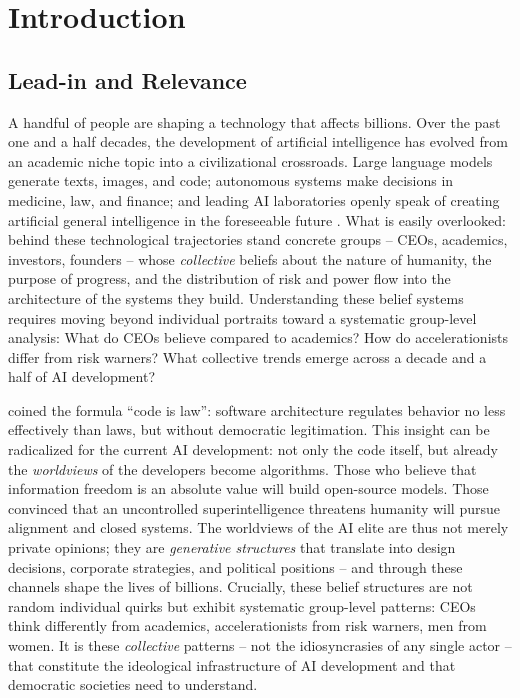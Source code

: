 \documentclass[12pt,a4paper]{article}
\begin{document}
\newpage
\setcounter{page}{1}

\section{Introduction}
\label{sec:einleitung}

\subsection{Lead-in and Relevance}
\label{sec:einleitung:relevanz}

A handful of people are shaping a technology that affects billions. Over the past one and a half decades, the development of artificial intelligence has evolved from an academic niche topic into a civilizational crossroads. Large language models generate texts, images, and code; autonomous systems make decisions in medicine, law, and finance; and leading AI laboratories openly speak of creating artificial general intelligence in the foreseeable future \citep{OpenAI2023Charter, AnthropicCoreViews2023, Bengio2024}. What is easily overlooked: behind these technological trajectories stand concrete groups -- CEOs, academics, investors, founders -- whose \emph{collective} beliefs about the nature of humanity, the purpose of progress, and the distribution of risk and power flow into the architecture of the systems they build. Understanding these belief systems requires moving beyond individual portraits toward a systematic group-level analysis: What do CEOs believe compared to academics? How do accelerationists differ from risk warners? What collective trends emerge across a decade and a half of AI development?

\citet{Lessig1999} coined the formula ``code is law'': software architecture regulates behavior no less effectively than laws, but without democratic legitimation. This insight can be radicalized for the current AI development: not only the code itself, but already the \emph{worldviews} of the developers become algorithms. Those who believe that information freedom is an absolute value will build open-source models. Those convinced that an uncontrolled superintelligence threatens humanity will pursue alignment and closed systems. The worldviews of the AI elite are thus not merely private opinions; they are \emph{generative structures} that translate into design decisions, corporate strategies, and political positions -- and through these channels shape the lives of billions. Crucially, these belief structures are not random individual quirks but exhibit systematic group-level patterns: CEOs think differently from academics, accelerationists from risk warners, men from women. It is these \emph{collective} patterns -- not the idiosyncrasies of any single actor -- that constitute the ideological infrastructure of AI development and that democratic societies need to understand.
\end{document}
